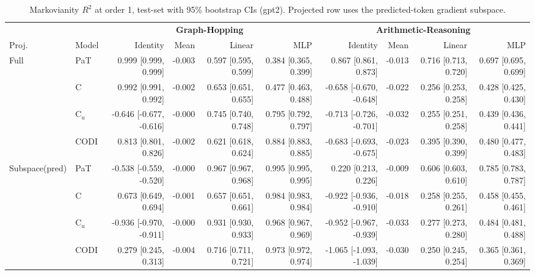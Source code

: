 \begin{table}[h!]
\centering
\tiny
\setlength{\tabcolsep}{4pt}
\begin{tabular}{llrrrrrrrr}
\toprule
& & \multicolumn{4}{c}{\textbf{Graph-Hopping}} & \multicolumn{4}{c}{\textbf{Arithmetic-Reasoning}} \\
\cmidrule(lr){3-6}\cmidrule(lr){7-10}
Proj. & Model & Identity & Mean & Linear & MLP & Identity & Mean & Linear & MLP \\
\midrule
\multirow{4}{*}{Full} & PaT & 0.999 [0.999, 0.999] & -0.003 & 0.597 [0.595, 0.599] & 0.384 [0.365, 0.399] & 0.867 [0.861, 0.873] & -0.013 & 0.716 [0.713, 0.720] & 0.697 [0.695, 0.699] \\
 & C & 0.992 [0.991, 0.992] & -0.002 & 0.653 [0.651, 0.655] & 0.477 [0.463, 0.488] & -0.658 [-0.670, -0.648] & -0.022 & 0.256 [0.253, 0.258] & 0.428 [0.425, 0.430] \\
 & C$_u$ & -0.646 [-0.677, -0.616] & -0.000 & 0.745 [0.740, 0.748] & 0.795 [0.792, 0.797] & -0.713 [-0.726, -0.701] & -0.032 & 0.255 [0.251, 0.258] & 0.439 [0.436, 0.441] \\
 & CODI & 0.813 [0.801, 0.826] & -0.002 & 0.621 [0.618, 0.624] & 0.884 [0.883, 0.885] & -0.683 [-0.693, -0.675] & -0.023 & 0.395 [0.390, 0.399] & 0.480 [0.477, 0.483] \\
\midrule
\multirow{4}{*}{Subspace(pred)} & PaT & -0.538 [-0.559, -0.520] & -0.000 & 0.967 [0.967, 0.968] & 0.995 [0.995, 0.995] & 0.220 [0.213, 0.226] & -0.009 & 0.606 [0.603, 0.610] & 0.785 [0.783, 0.787] \\
 & C & 0.673 [0.649, 0.694] & -0.001 & 0.657 [0.651, 0.661] & 0.984 [0.983, 0.984] & -0.922 [-0.936, -0.910] & -0.018 & 0.258 [0.255, 0.261] & 0.458 [0.455, 0.461] \\
 & C$_u$ & -0.936 [-0.970, -0.911] & -0.000 & 0.931 [0.930, 0.933] & 0.968 [0.967, 0.969] & -0.952 [-0.967, -0.939] & -0.033 & 0.277 [0.273, 0.280] & 0.484 [0.481, 0.488] \\
 & CODI & 0.279 [0.245, 0.313] & -0.004 & 0.716 [0.711, 0.721] & 0.973 [0.972, 0.974] & -1.065 [-1.093, -1.039] & -0.030 & 0.250 [0.245, 0.254] & 0.365 [0.361, 0.369] \\
\bottomrule
\end{tabular}
\caption{Markovianity $R^2$ at order 1, test-set with 95\% bootstrap CIs (gpt2). Projected row uses the predicted-token gradient subspace.}
\label{tab:markovianity_gpt2_pred}
\end{table}

